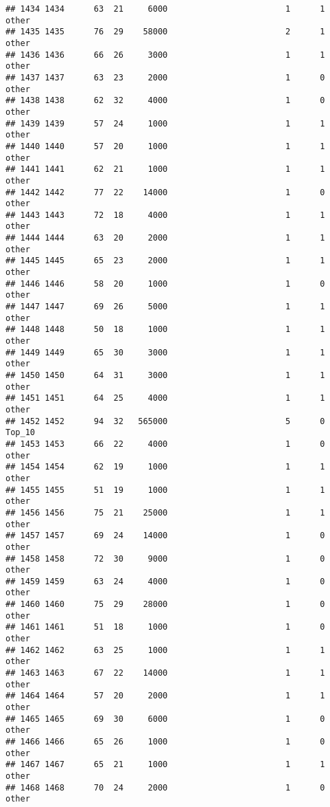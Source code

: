 \documentclass[
]{article}
\begin{document}
\begin{verbatim}
## 1434 1434      63  21     6000                        1      1    other
## 1435 1435      76  29    58000                        2      1    other
## 1436 1436      66  26     3000                        1      1    other
## 1437 1437      63  23     2000                        1      0    other
## 1438 1438      62  32     4000                        1      0    other
## 1439 1439      57  24     1000                        1      1    other
## 1440 1440      57  20     1000                        1      1    other
## 1441 1441      62  21     1000                        1      1    other
## 1442 1442      77  22    14000                        1      0    other
## 1443 1443      72  18     4000                        1      1    other
## 1444 1444      63  20     2000                        1      1    other
## 1445 1445      65  23     2000                        1      1    other
## 1446 1446      58  20     1000                        1      0    other
## 1447 1447      69  26     5000                        1      1    other
## 1448 1448      50  18     1000                        1      1    other
## 1449 1449      65  30     3000                        1      1    other
## 1450 1450      64  31     3000                        1      1    other
## 1451 1451      64  25     4000                        1      1    other
## 1452 1452      94  32   565000                        5      0   Top_10
## 1453 1453      66  22     4000                        1      0    other
## 1454 1454      62  19     1000                        1      1    other
## 1455 1455      51  19     1000                        1      1    other
## 1456 1456      75  21    25000                        1      1    other
## 1457 1457      69  24    14000                        1      0    other
## 1458 1458      72  30     9000                        1      0    other
## 1459 1459      63  24     4000                        1      0    other
## 1460 1460      75  29    28000                        1      0    other
## 1461 1461      51  18     1000                        1      0    other
## 1462 1462      63  25     1000                        1      1    other
## 1463 1463      67  22    14000                        1      1    other
## 1464 1464      57  20     2000                        1      1    other
## 1465 1465      69  30     6000                        1      0    other
## 1466 1466      65  26     1000                        1      0    other
## 1467 1467      65  21     1000                        1      1    other
## 1468 1468      70  24     2000                        1      0    other

\end{verbatim}
\end{document}
